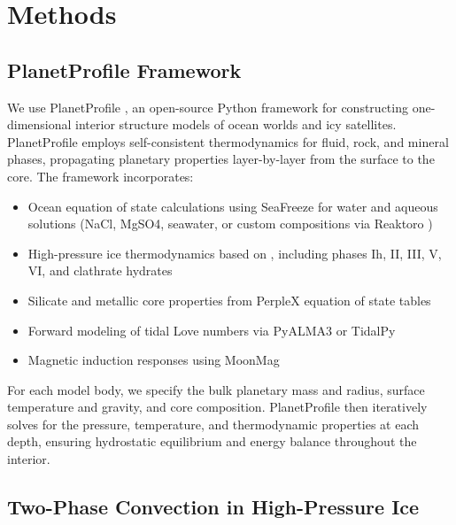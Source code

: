 %

\section{Methods}

\subsection{PlanetProfile Framework}

We use PlanetProfile \citep{vance2018planetprofile}, an open-source Python framework for constructing one-dimensional interior structure models of ocean worlds and icy satellites. PlanetProfile employs self-consistent thermodynamics for fluid, rock, and mineral phases, propagating planetary properties layer-by-layer from the surface to the core. The framework incorporates:

\begin{itemize}
    \item Ocean equation of state calculations using SeaFreeze \citep{journaux2020seafreeze} for water and aqueous solutions (NaCl, MgSO4, seawater, or custom compositions via Reaktoro \citep{leal2017reaktoro})
    \item High-pressure ice thermodynamics based on \citet{journaux2020gibbs}, including phases Ih, II, III, V, VI, and clathrate hydrates
    \item Silicate and metallic core properties from PerpleX \citep{connolly2005perplex} equation of state tables
    \item Forward modeling of tidal Love numbers via PyALMA3 \citep{beuthe2013pyalma3} or TidalPy \citep{tobie2024tidalpy}
    \item Magnetic induction responses using MoonMag \citep{styczinski2021moonmag}
\end{itemize}

For each model body, we specify the bulk planetary mass and radius, surface temperature and gravity, and core composition. PlanetProfile then iteratively solves for the pressure, temperature, and thermodynamic properties at each depth, ensuring hydrostatic equilibrium and energy balance throughout the interior.

\subsection{Two-Phase Convection in High-Pressure Ice}

